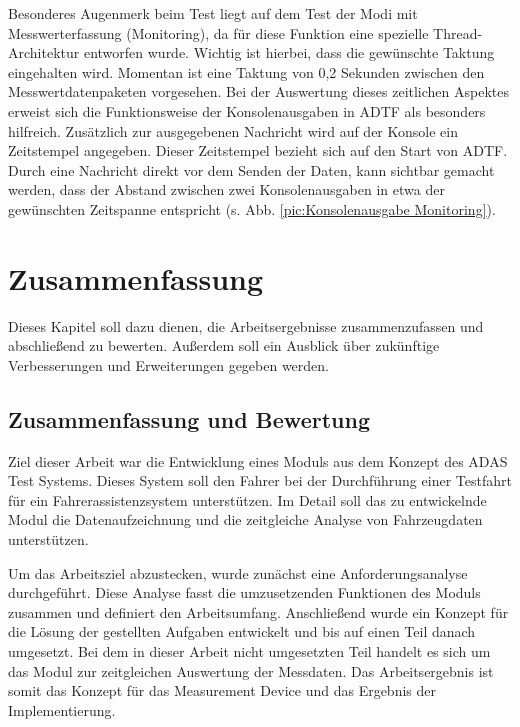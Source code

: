\documentclass[12pt,a4paper]{report}
\begin{document}
Besonderes Augenmerk beim Test liegt auf dem Test der Modi mit Messwerterfassung (Monitoring), da für diese Funktion eine spezielle Thread-Architektur entworfen wurde. Wichtig ist hierbei, dass die gewünschte Taktung eingehalten wird. Momentan ist eine Taktung von 0,2 Sekunden zwischen den Messwertdatenpaketen vorgesehen. Bei der Auswertung dieses zeitlichen Aspektes erweist sich die Funktionsweise der Konsolenausgaben in ADTF als besonders hilfreich. Zusätzlich zur ausgegebenen Nachricht wird auf der Konsole ein Zeitstempel angegeben. Dieser Zeitstempel bezieht sich auf den Start von ADTF. Durch eine Nachricht direkt vor dem Senden der Daten, kann sichtbar gemacht werden, dass der Abstand zwischen zwei Konsolenausgaben in etwa der gewünschten Zeitspanne entspricht (s. Abb. \ref{pic:Konsolenausgabe Monitoring}). 
\chapter{Zusammenfassung}\label{chap:Zusammenfassung}
Dieses Kapitel soll dazu dienen, die Arbeitsergebnisse zusammenzufassen und abschließend zu bewerten. Außerdem soll ein Ausblick über zukünftige Verbesserungen und Erweiterungen gegeben werden.
\section{Zusammenfassung und Bewertung}\label{sec:Zusammenfassung und Bewertung der Arbeiten}
Ziel dieser Arbeit war die Entwicklung eines Moduls aus dem Konzept des ADAS Test Systems. Dieses System soll den Fahrer bei der Durchführung einer Testfahrt für ein Fahrerassistenzsystem unterstützen. Im Detail soll das zu entwickelnde Modul die Datenaufzeichnung und die zeitgleiche Analyse von Fahrzeugdaten unterstützen.

Um das Arbeitsziel abzustecken, wurde zunächst eine Anforderungsanalyse durchgeführt. Diese Analyse fasst die umzusetzenden Funktionen des Moduls zusammen und definiert den Arbeitsumfang. Anschließend wurde ein Konzept für die Lösung der gestellten Aufgaben entwickelt und bis auf einen Teil danach umgesetzt. Bei dem in dieser Arbeit nicht umgesetzten Teil handelt es sich um das Modul zur zeitgleichen Auswertung der Messdaten. Das Arbeitsergebnis ist somit das Konzept für das Measurement Device und das Ergebnis der Implementierung. 
\end{document}
